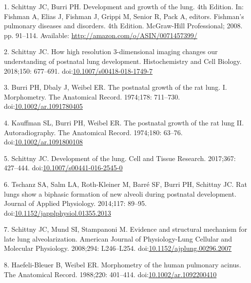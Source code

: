 \documentclass[
  american,
]{article}
\newenvironment{cslreferences}%
  {}%
  {\par}
\begin{document}
\hypertarget{refs}{}
\begin{cslreferences}
\leavevmode\hypertarget{ref-TsNwin2E}{}%
1. Schittny JC, Burri PH. Development and growth of the lung. 4th Edition. In: Fishman A, Elias J, Fishman J, Grippi M, Senior R, Pack A, editors. Fishman's pulmonary diseases and disorders. 4th Edition. McGraw-Hill Professional; 2008. pp. 91--114. Available: \url{http://amazon.com/o/ASIN/0071457399/}

\leavevmode\hypertarget{ref-ODQCVC23}{}%
2. Schittny JC. How high resolution 3-dimensional imaging changes our understanding of postnatal lung development. Histochemistry and Cell Biology. 2018;150: 677--691. doi:\href{https://doi.org/10.1007/s00418-018-1749-7}{10.1007/s00418-018-1749-7}

\leavevmode\hypertarget{ref-auNiE56G}{}%
3. Burri PH, Dbaly J, Weibel ER. The postnatal growth of the rat lung. I. Morphometry. The Anatomical Record. 1974;178: 711--730. doi:\href{https://doi.org/10.1002/ar.1091780405}{10.1002/ar.1091780405}

\leavevmode\hypertarget{ref-1AhvLCPky}{}%
4. Kauffman SL, Burri PH, Weibel ER. The postnatal growth of the rat lung II. Autoradiography. The Anatomical Record. 1974;180: 63--76. doi:\href{https://doi.org/10.1002/ar.1091800108}{10.1002/ar.1091800108}

\leavevmode\hypertarget{ref-XQLPrPTJ}{}%
5. Schittny JC. Development of the lung. Cell and Tissue Research. 2017;367: 427--444. doi:\href{https://doi.org/10.1007/s00441-016-2545-0}{10.1007/s00441-016-2545-0}

\leavevmode\hypertarget{ref-wnl86DEM}{}%
6. Tschanz SA, Salm LA, Roth-Kleiner M, Barré SF, Burri PH, Schittny JC. Rat lungs show a biphasic formation of new alveoli during postnatal development. Journal of Applied Physiology. 2014;117: 89--95. doi:\href{https://doi.org/10.1152/japplphysiol.01355.2013}{10.1152/japplphysiol.01355.2013}

\leavevmode\hypertarget{ref-d1YV8oOK}{}%
7. Schittny JC, Mund SI, Stampanoni M. Evidence and structural mechanism for late lung alveolarization. American Journal of Physiology-Lung Cellular and Molecular Physiology. 2008;294: L246--L254. doi:\href{https://doi.org/10.1152/ajplung.00296.2007}{10.1152/ajplung.00296.2007}

\leavevmode\hypertarget{ref-BbEFwEVD}{}%
8. Haefeli-Bleuer B, Weibel ER. Morphometry of the human pulmonary acinus. The Anatomical Record. 1988;220: 401--414. doi:\href{https://doi.org/10.1002/ar.1092200410}{10.1002/ar.1092200410}


\end{cslreferences}
\end{document}
